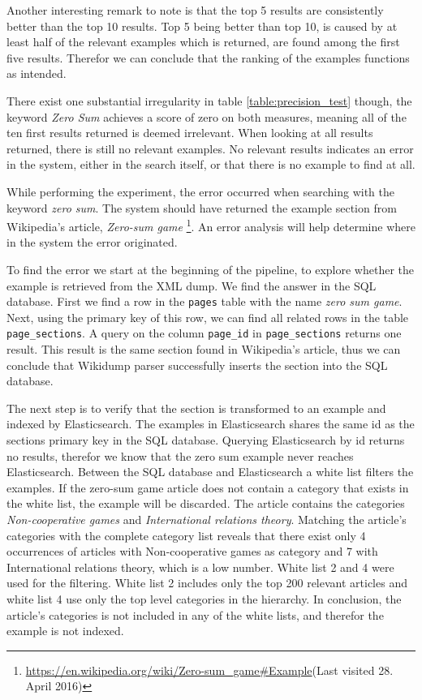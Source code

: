 Another interesting remark to note is that the top 5 results are consistently better than the top 10 results. Top 5 being better than top 10, is caused by at least half of the relevant examples which is returned, are found among the first five results. Therefor we can conclude that the ranking of the examples functions as intended. 

There exist one substantial irregularity in table \ref{table:precision_test} though, the keyword \textit{Zero Sum} achieves a score of zero on both measures, meaning all of the ten first results returned is deemed irrelevant. When looking at all results returned, there is still no relevant examples. No relevant results indicates an error in the system, either in the search itself, or that there is no example to find at all.

While performing the experiment, the error occurred when searching with the keyword \textit{zero sum}. The system should have returned the example section from Wikipedia's article, \textit{Zero-sum game} \footnote{\url{https://en.wikipedia.org/wiki/Zero-sum\_game\#Example}(Last visited 28. April 2016)}. An error analysis will help determine where in the system the error originated. 

To find the error we start at the beginning of the pipeline, to explore whether the example is retrieved from the XML dump. We find the answer in the SQL database. First we find a row in the \texttt{pages} table with the name \textit{zero sum game}. Next, using the primary key of this row, we can find all related rows in the table \texttt{page\_sections}. A query on the column \texttt{page\_id} in \texttt{page\_sections} returns one result. This result is the same section found in Wikipedia's article, thus we can conclude that Wikidump parser successfully inserts the section into the SQL database.

The next step is to verify that the section is transformed to an example and indexed by Elasticsearch. The examples in Elasticsearch shares the same id as the sections primary key in the SQL database. Querying Elasticsearch by id returns no results, therefor we know that the zero sum example never reaches Elasticsearch. Between the SQL database and Elasticsearch a white list filters the examples. If the zero-sum game article does not contain a category that exists in the white list, the example will be discarded. The article contains the categories \textit{Non-cooperative games} and \textit{International relations theory}. Matching the article's categories with the complete category list reveals that there exist only 4 occurrences of articles with Non-cooperative games as category and 7 with International relations theory, which is a low number. White list 2 and 4 were used for the filtering. White list 2 includes only the top 200 relevant articles and white list 4 use only the top level categories in the hierarchy. In conclusion, the article's categories is not included in any of the white lists, and therefor the example is not indexed.

